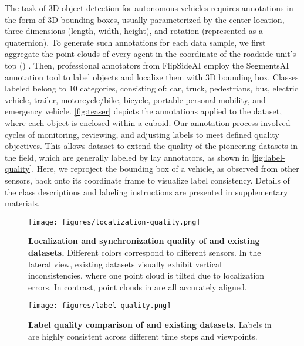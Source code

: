 The task of 3D object detection for autonomous vehicles requires annotations in the form of 3D bounding boxes, usually parameterized by the center location, three dimensions (length, width, height), and rotation (represented as a quaternion).
To generate such annotations for each data sample, we first aggregate the point clouds of every agent in the coordinate of the roadside unit's top (\rsutop) \lidar.
Then, professional annotators from FlipSideAI \cite{flipside} employ the SegmentsAI \cite{segments} annotation tool to label objects and localize them with 3D bounding box. Classes labeled belong to 10 categories, consisting of: car, truck, pedestrians, bus, electric vehicle, trailer, motorcycle/bike, bicycle, portable personal mobility, and emergency vehicle. 
\autoref{fig:teaser} depicts the annotations applied to the dataset, where each object is enclosed within a cuboid. 
Our annotation process involved cycles of monitoring, reviewing, and adjusting labels to meet defined quality objectives.
This allows \ours dataset to extend the quality of the pioneering datasets in the field, which are generally labeled by lay annotators, as shown in \autoref{fig:label-quality}. Here, we reproject the bounding box of a vehicle, as observed from other sensors, back onto its coordinate frame to visualize label consistency. 
Details of the class descriptions and labeling instructions are presented in supplementary materials.

\begin{figure}
    \centering
    \texttt{[image: figures/localization-quality.png]}
    \caption{\small \textbf{Localization and synchronization quality of \ours and existing datasets.} Different colors correspond to different sensors. In the lateral view, existing datasets visually exhibit vertical inconsistencies, where one point cloud is tilted due to localization errors. In contrast, point clouds in \ours are all accurately aligned.
    }
    \label{fig:localization-quality}
\end{figure}

\begin{figure}
    \centering
    \texttt{[image: figures/label-quality.png]}
    \caption{\small \textbf{Label quality comparison of \ours and existing datasets.} Labels in \ours are highly consistent across different time steps and viewpoints.}
    \label{fig:label-quality}
\end{figure}

